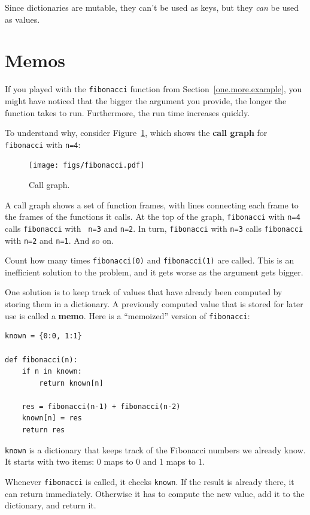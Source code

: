 \documentclass[10pt]{book}
\begin{document}
Since dictionaries are mutable, they can't be used as keys,
but they {\em can} be used as values.


\section{Memos}
\label{memoize}

If you played with the {\tt fibonacci} function from
Section~\ref{one.more.example}, you might have noticed that the bigger
the argument you provide, the longer the function takes to run.
Furthermore, the run time increases quickly.

To understand why, consider Figure~\ref{fig.fibonacci}, which shows
the {\bf call graph} for {\tt fibonacci} with {\tt n=4}:

\begin{figure}
\centerline
{\texttt{[image: figs/fibonacci.pdf]}}
\caption{Call graph.}
\label{fig.fibonacci}
\end{figure}

A call graph shows a set of function frames, with lines connecting each
frame to the frames of the functions it calls.  At the top of the
graph, {\tt fibonacci} with {\tt n=4} calls {\tt fibonacci} with {\tt
n=3} and {\tt n=2}.  In turn, {\tt fibonacci} with {\tt n=3} calls
{\tt fibonacci} with {\tt n=2} and {\tt n=1}.  And so on.

Count how many times {\tt fibonacci(0)} and {\tt fibonacci(1)} are
called.  This is an inefficient solution to the problem, and it gets
worse as the argument gets bigger.

One solution is to keep track of values that have already been
computed by storing them in a dictionary.  A previously computed value
that is stored for later use is called a {\bf memo}.  Here is a
``memoized'' version of {\tt fibonacci}:

\begin{verbatim}
known = {0:0, 1:1}

def fibonacci(n):
    if n in known:
        return known[n]

    res = fibonacci(n-1) + fibonacci(n-2)
    known[n] = res
    return res
\end{verbatim}
%
{\tt known} is a dictionary that keeps track of the Fibonacci
numbers we already know.  It starts with
two items: 0 maps to 0 and 1 maps to 1.

Whenever {\tt fibonacci} is called, it checks {\tt known}.
If the result is already there, it can return
immediately.  Otherwise it has to
compute the new value, add it to the dictionary, and return it.
\end{document}
